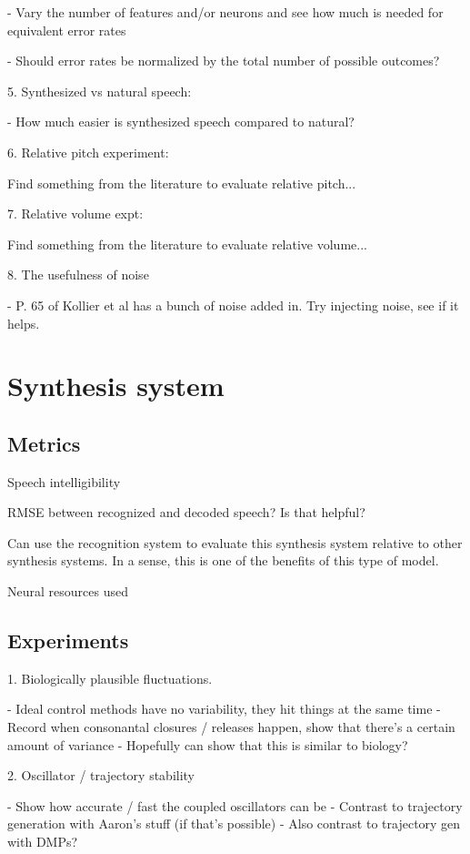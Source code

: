 - Vary the number of features and/or neurons and see
  how much is needed for equivalent error rates

  - Should error rates be normalized by the total number
    of possible outcomes?

5. Synthesized vs natural speech:

- How much easier is synthesized speech compared to natural?

6. Relative pitch experiment:

Find something from the literature to evaluate relative pitch...

7. Relative volume expt:

Find something from the literature to evaluate relative volume...

8. The usefulness of noise

- P. 65 of Kollier et al has a bunch of noise added in.
  Try injecting noise, see if it helps.

\section{Synthesis system}

\subsection{Metrics}

Speech intelligibility

RMSE between recognized and decoded speech?
Is that helpful?

Can use the recognition system to evaluate
this synthesis system relative to other
synthesis systems.
In a sense, this is one of the benefits
of this type of model.

Neural resources used

\subsection{Experiments}

1. Biologically plausible fluctuations.

- Ideal control methods have no variability, they hit things at the same time
- Record when consonantal closures / releases happen, show that there's
  a certain amount of variance
- Hopefully can show that this is similar to biology?

2. Oscillator / trajectory stability

- Show how accurate / fast the coupled oscillators can be
- Contrast to trajectory generation with Aaron's stuff
  (if that's possible)
  - Also contrast to trajectory gen with DMPs?

